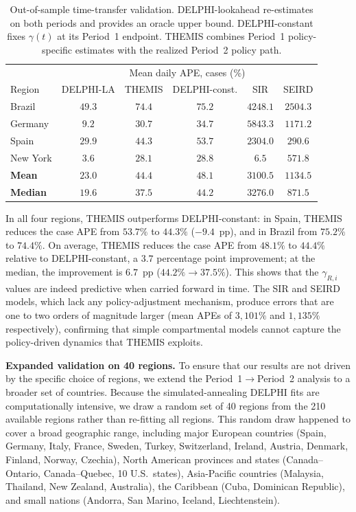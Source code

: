 \documentclass[letterpaper,twoside,11pt]{reviewresponse}
\begin{document}
\begin{enumerate}
    \begin{table}[h!]
    \centering
    \begin{tabular}{|l|ccccc|}
    \hline
    & \multicolumn{5}{c|}{Mean daily APE, cases (\%)} \\
    Region & DELPHI-LA  & THEMIS & DELPHI-const. & SIR & SEIRD \\\hline
    Brazil     & $49.3$  & $\mathbf{74.4}$ & $75.2$ & $4248.1$ & $2504.3$ \\
    Germany    & $9.2$   & $\mathbf{30.7}$ & $34.7$ & $5843.3$ & $1171.2$ \\
    Spain      & $29.9$ & $\mathbf{44.3}$ & $53.7$ & $2304.0$ & $290.6$ \\
    New York   & $3.6$   & $\mathbf{28.1}$ & $28.8$ & $6.5$    & $571.8$ \\\hline
    \textbf{Mean}   & $23.0$ & $\mathbf{44.4}$ & $48.1$ & $3100.5$ & $1134.5$ \\
    \textbf{Median} & $19.6$ & $\mathbf{37.5}$ & $44.2$ & $3276.0$ & $871.5$ \\\hline
    \end{tabular}
    \caption{Out-of-sample time-transfer validation. DELPHI-lookahead re-estimates on both periods and provides an oracle upper bound. DELPHI-constant fixes $\gamma(t)$ at its Period~1 endpoint. THEMIS combines Period~1 policy-specific estimates with the realized Period~2 policy path.}
    \label{tab:time_transfer_main}
    \end{table}
    
    In all four regions, THEMIS outperforms DELPHI-constant: in Spain, THEMIS reduces the case APE from $53.7\%$ to $44.3\%$ ($-9.4$~pp), and in Brazil from $75.2\%$ to $74.4\%$. On average, THEMIS reduces the case APE from $48.1\%$ to $44.4\%$ relative to DELPHI-constant, a $3.7$ percentage point improvement; at the median, the improvement is $6.7$~pp ($44.2\% \to 37.5\%$). This shows that the $\gamma_{R,i}$ values are indeed predictive when carried forward in time. The SIR and SEIRD models, which lack any policy-adjustment mechanism, produce errors that are one to two orders of magnitude larger (mean APEs of $3{,}101\%$ and $1{,}135\%$ respectively), confirming that simple compartmental models cannot capture the policy-driven dynamics that THEMIS exploits.
    
    \textbf{Expanded validation on 40 regions.} To ensure that our results are not driven by the specific choice of regions, we extend the Period~1$\to$Period~2 analysis to a broader set of countries. Because the simulated-annealing DELPHI fits are computationally intensive, we draw a random set of 40 regions from the 210 available regions rather than re-fitting all regions. This random draw happened to cover a broad geographic range, including major European countries (Spain, Germany, Italy, France, Sweden, Turkey, Switzerland, Ireland, Austria, Denmark, Finland, Norway, Czechia), North American provinces and states (Canada--Ontario, Canada--Quebec, 10 U.S.\ states), Asia-Pacific countries (Malaysia, Thailand, New Zealand, Australia), the Caribbean (Cuba, Dominican Republic), and small nations (Andorra, San Marino, Iceland, Liechtenstein).
    

\end{enumerate}
\end{document}
